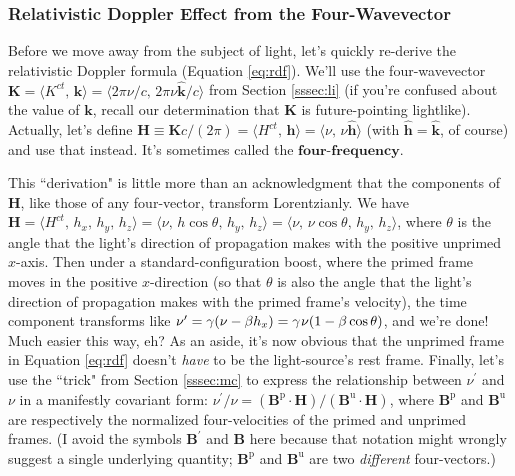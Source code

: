 \documentclass[12pt]{article}
\renewcommand{\vv}[1]{\mathbf{#1}}
\begin{document}
\subsubsection{Relativistic Doppler Effect from the Four-Wavevector}

Before we move away from the subject of light, let's quickly re-derive the relativistic Doppler formula (Equation \ref{eq:rdf}). We'll use the four-wavevector ${\vv K = \langle K^{ct}, \, \vv k \rangle = \langle 2 \pi \nu / c, \, 2 \pi \nu \vv{\hat{k}} / c \rangle }$ from Section \ref{sssec:li} (if you're confused about the value of $\vv k$, recall our determination that $\vv K$ is future-pointing lightlike). Actually, let's define ${\vv H \equiv \vv K c / (2 \pi) = \langle H^{ct}, \, \vv h \rangle = \langle \nu, \, \nu \vv{\hat{h}} \rangle }$ (with $\vv{\hat{h}} = \vv{\hat{k}}$, of course) and use that instead. It's sometimes called the $\textbf{four-frequency}$.

This ``derivation" is little more than an acknowledgment that the components of $\vv H$, like those of any four-vector, transform Lorentzianly. We have ${\vv H = \langle H^{ct}, \, h_x, \, h_y, \, h_z \rangle = \langle \nu , \, h \cos \theta, \, h_y, \, h_z \rangle = \langle \nu , \, \nu \cos \theta, \, h_y, \, h_z \rangle}$, where $\theta$ is the angle that the light's direction of propagation makes with the positive unprimed $x$-axis. Then under a standard-configuration boost, where the primed frame moves in the positive $x$-direction (so that $\theta$ is also the angle that the light's direction of propagation makes with the primed frame's velocity), the time component transforms like $\nu ^{\prime} = \gamma (\nu - \beta h_x ) = \gamma \mkern1mu \nu (1 - \beta \cos \theta)$, and we're done! Much easier this way, eh? As an aside, it's now obvious that the unprimed frame in Equation \ref{eq:rdf} doesn't \emph{have} to be the light-source's rest frame. Finally, let's use the ``trick" from Section \ref{sssec:mc} to express the relationship between $\nu ^{\prime}$ and $\nu$ in a manifestly covariant form: $\nu ^{\prime} / \nu = (\vv B^{\textrm{p}} \cdot \vv H) / (\vv B^{\textrm{u}} \cdot \vv H)$, where $\vv B^{\textrm{p}}$ and $\vv B^{\textrm{u}}$ are respectively the normalized four-velocities of the primed and unprimed frames. (I avoid the symbols $\vv B ^{\prime}$ and $\vv B$ here because that notation might wrongly suggest a single underlying quantity; $\vv B^{\textrm{p}}$ and $\vv B^{\textrm{u}}$ are two \emph{different} four-vectors.)


\clearpage
\end{document}
